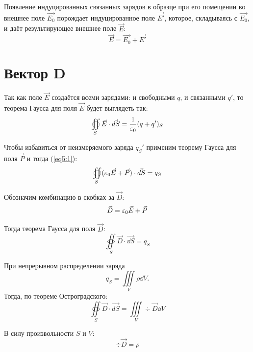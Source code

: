     Появление индуцированных связанных зарядов в образце при его помещении во
    внешнее поле \( \vec{E_0} \) порождает индуцированное поле \( \vec{E'} \),
    которое, складываясь с \( \vec{E_0} \), и даёт результирующее внешнее поле
    \( \vec{E} \):
    \begin{equation}
        \vec{E} = \vec{E_0} + \vec{E'}
    \end{equation}

\section{Вектор \textbf{D}}

    Так как поле \( \vec{E} \) создаётся всеми зарядами: и свободными \( q \),
    и связанными \( q' \), то теорема Гаусса для поля \( \vec{E} \) будет
    выглядеть так:
    \begin{equation}
        \oiint\limits_S \vec{E}\cdot\vec{dS} = \frac{1}{\varepsilon_0}(q+q')_S
        \label{eq5:1}
    \end{equation}
    
    Чтобы избавиться от неизмеряемого заряда \( q_S' \) применим теорему Гаусса для поля \( \vec{P} \) и тогда (\ref{eq5:1}):
    \[
        \oiint\limits_S (\varepsilon_0\vec{E} + \vec{P})\cdot\vec{dS} = q_S
    \]
    
    Обозначим комбинацию в скобках за \( \vec{D} \):
    \begin{equation}
        \vec{D} = \varepsilon_0\vec{E} + \vec{P} \label{eq5:2}
    \end{equation}
    
    Тогда теорема Гаусса для поля \( \vec{D} \):
    \begin{equation}
        \oiint\limits_S \vec{D}\cdot\vec{\dd S} = q_S
        \label{eq5:3}
    \end{equation}
    
    При непрерывном распределении заряда
    \[
        q_S = \iiint\limits_V \rho \dd V.
    \]
    Тогда, по теореме Остроградского:
    \[
        \oiint\limits_S \vec{D}\cdot\vec{dS} = \iiint\limits_V \div\vec{D}\dd V 
    \]
    
    В силу произвольности \( S \) и \( V \):
    \begin{equation}
        \div\vec{D} = \rho \label{eq5:4}
    \end{equation}
    
